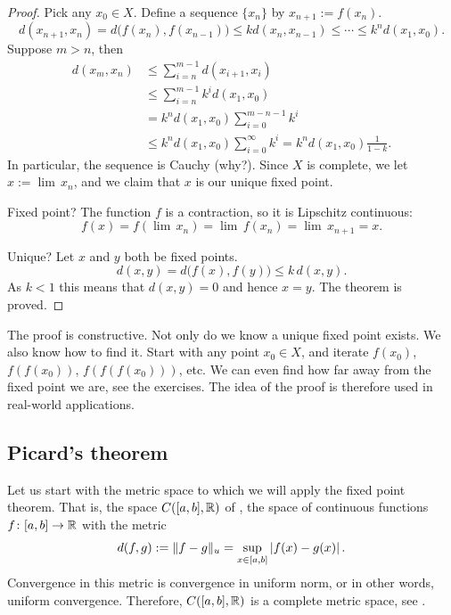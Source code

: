 \begin{proof}
Pick any $x_0 \in X$.
Define a sequence $\{ x_n \}$ by $x_{n+1} := f(x_n)$.
\begin{equation*}
d(x_{n+1},x_n) = d\bigl(f(x_n),f(x_{n-1})\bigr)
\leq k d(x_n,x_{n-1})
\leq \cdots
\leq k^n d(x_1,x_0) .
\end{equation*}
Suppose $m > n$, then
\begin{equation*}
\begin{split}
d(x_m,x_n)
& \leq \sum_{i=n}^{m-1} d(x_{i+1},x_i) \\
& \leq \sum_{i=n}^{m-1} k^i d(x_1,x_0) \\
& = k^n d(x_1,x_0) \sum_{i=0}^{m-n-1} k^i \\
& \leq k^n d(x_1,x_0) \sum_{i=0}^{\infty} k^i
= k^n d(x_1,x_0) \frac{1}{1-k} .
\end{split}
\end{equation*}
In particular, the sequence is Cauchy (why?).  Since $X$ is complete,
we let $x := \lim\, x_n$, and we claim that $x$
is our unique fixed point.

Fixed point?  The function $f$ is a contraction,
so it is Lipschitz continuous:
\begin{equation*}
f(x) = f( \lim \, x_n) = \lim\, f(x_n) = \lim\, x_{n+1} = x .
\end{equation*}

Unique?  Let $x$ and $y$ both be fixed points.
\begin{equation*}
d(x,y) = d\bigl(f(x),f(y)\bigr) \leq k\, d(x,y) .
\end{equation*}
As $k < 1$ this means that $d(x,y) = 0$ and hence $x=y$.  The theorem is
proved.
\end{proof}

The proof is constructive.  Not only do we know 
a unique fixed point exists.  We also know how to find it.  Start with
any point $x_0 \in X$, and iterate $f(x_0)$,
$f(f(x_0))$,
$f(f(f(x_0)))$, etc.  We can even find how far away
from the fixed point we are, see the exercises.  The idea of the proof is
therefore used in real-world applications.

\subsection{Picard's theorem}

Let us start with the metric space to which we will apply the
fixed point theorem.
That is, the
space $C([a,b],{\mathbb{R}})$ of ,
the space of continuous functions $f \colon [a,b] \to {\mathbb{R}}$ with the metric
\begin{equation*}
d(f,g) := \lVert {f-g} \rVert_u = \sup_{x \in [a,b]} \left\lvert {f(x)-g(x)} \right\rvert .
\end{equation*}
Convergence in this metric is convergence in uniform norm, or in other
words, uniform convergence.  Therefore,
$C([a,b],{\mathbb{R}})$ is a complete metric space,
see .

